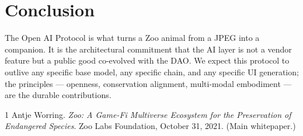 \documentclass[11pt,letterpaper]{article}
\begin{document}
\section{Conclusion}

The Open AI Protocol is what turns a Zoo animal from a JPEG into a companion. It is the architectural commitment that the AI layer is not a vendor feature but a public good co-evolved with the DAO. We expect this protocol to outlive any specific base model, any specific chain, and any specific UI generation; the principles --- openness, conservation alignment, multi-modal embodiment --- are the durable contributions.

\begin{thebibliography}{1}
 Antje Worring. \emph{Zoo: A Game-Fi Multiverse Ecosystem for the Preservation of Endangered Species}. Zoo Labs Foundation, October 31, 2021. (Main whitepaper.)
\end{thebibliography}
\end{document}

